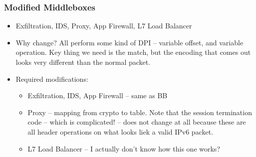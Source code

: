 \subsubsection{Modified Middleboxes}
\begin{itemize}
  \item Exfiltration, IDS, Proxy, App Firewall, L7 Load Balancer
  \item Why change? All perform some kind of DPI -- variable offset, and variable operation. Key thing we need is the match, but the encoding that comes out looks very different than the normal packet.
  \item Required modifications:
    \begin{itemize}
      \item Exfiltration, IDS, App Firewall -- same as BB
      \item Proxy -- mapping from crypto to table. Note that the session termination code -- which is complicated! -- does not change at all because these are all header operations on what looks liek a valid IPv6 packet.
      \item L7 Load Balancer -- I actually don't know how this one works?
    \end{itemize}
\end{itemize}
